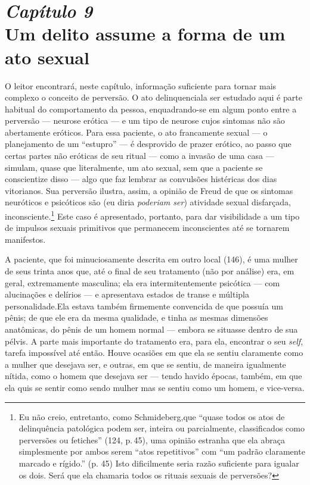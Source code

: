 \chapter[\textbf{9}\quad Um delito assume a forma de um ato sexual]{{\large\textit{Capítulo 9}}\\ Um delito assume a forma de um ato sexual}


O leitor encontrará, neste capítulo, informação suficiente para tornar
mais complexo o conceito de perversão. O ato delinquencial\idxcrime[|(] a ser
estudado aqui é parte habitual do comportamento da pessoa,
enquadrando-se em algum ponto entre a perversão --- neurose\idxneuro{} erótica
 --- e um tipo de neurose\idxpervneuro{} cujos sintomas não são abertamente eróticos.
Para essa paciente, o ato francamente sexual --- o planejamento de
um ``estupro''\idxestup{} --- é desprovido de prazer
erótico, ao passo que certas partes não eróticas de seu ritual ---
como a invasão de uma casa --- simulam, quase que literalmente, um ato
sexual, sem que a paciente se conscientize disso --- algo que faz
lembrar as convulsões histéricas dos dias vitorianos. Sua perversão
ilustra, assim, a opinião de Freud\idxfreud{} de que os sintomas neuróticos e
psicóticos são (eu diria \textit{poderiam ser}) atividade sexual
disfarçada, inconsciente.\footnote{ Eu não creio, entretanto, como
Schmideberg,\idxschmid[|nn] que ``quase todos os atos de delinquência
patológica podem ser, inteira ou parcialmente, classificados como
perversões ou fetiches'' (124, p.\,45), uma opinião
estranha que ela abraça simplesmente por ambos serem
``atos repetitivos'' com ``um
padrão claramente marcado e rígido.'' (p. 45) Isto
dificilmente seria razão suficiente para igualar os dois. Será que ela
chamaria todos os rituais sexuais de perversões?} Este caso é
apresentado, portanto, para dar visibilidade a um tipo de impulsos
sexuais primitivos que permanecem inconscientes até se tornarem
manifestos.

A paciente, que foi minuciosamente descrita em outro local (146), é
uma mulher de seus trinta anos que, até o final de seu tratamento (não
por análise) era, em geral, extremamente masculina; ela era
intermitentemente psicótica --- com alucinações\idxaluci{} e delírios --- e
apresentava estados de transe e múltipla personalidade.\idxmultp[|(] Ela estava
também firmemente convencida de que possuía um pênis; de que ele era da
mesma qualidade, e tinha as mesmas dimensões anatômicas, do pênis de um
homem normal --- embora se situasse dentro de sua pélvis. A parte mais
importante do tratamento era, para ela, encontrar o seu \textit{self},
tarefa impossível até então. Houve ocasiões em que ela se sentiu
claramente como a mulher que desejava ser, e outras, em que se sentiu,
de maneira igualmente nítida, como o homem que desejava ser --- tendo
havido épocas, também, em que ela quis se sentir como sendo mulher mas
se sentiu como um homem, e vice-versa.

